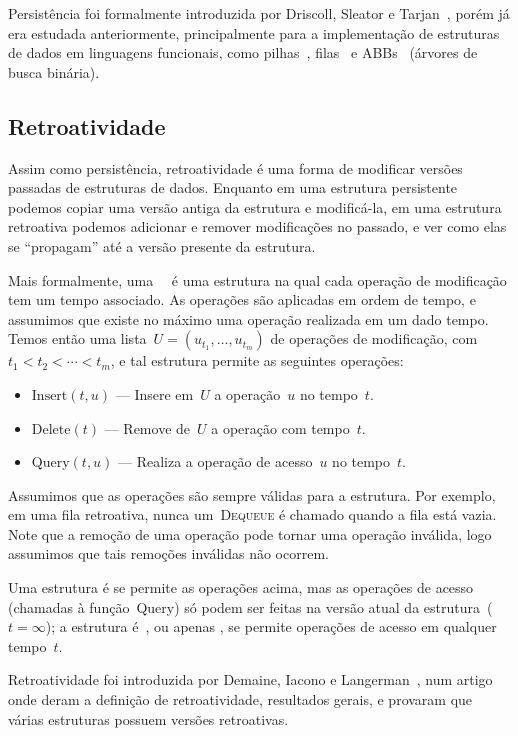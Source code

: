 \documentclass[quali.tex]{subfile}
\begin{document}
Persistência foi formalmente introduzida por Driscoll, Sleator e Tarjan~\cite{DriscollSST1989}, porém já era estudada anteriormente, principalmente para a implementação de estruturas de dados em linguagens funcionais, como pilhas~\cite{Myers83}, filas~\cite{HoodMelville} e ABBs~\cite{Myers82} (árvores de busca binária).

\subsection{Retroatividade}

Assim como persistência, retroatividade é uma forma de modificar versões passadas de estruturas de dados. Enquanto em uma estrutura persistente podemos copiar uma versão antiga da estrutura e modificá-la, em uma estrutura retroativa podemos adicionar e remover modificações no passado, e ver como elas se ``propagam'' até a versão presente da estrutura.

Mais formalmente, uma~~\cite{DemaineIL2007} é uma estrutura na qual cada operação de modificação tem um tempo associado. As operações são aplicadas em ordem de tempo, e assumimos que existe no máximo uma operação realizada em um dado tempo. Temos então uma lista~${U = (u_{t_1}, \ldots, u_{t_m})}$ de operações de modificação, com~${t_1 < t_2 < \cdots < t_m}$, e tal estrutura permite as seguintes operações:

\begin{itemize}
	\item $\text{Insert}(t, u)$ --- Insere em~$U$ a operação~$u$ no tempo~$t$.
	\item $\text{Delete}(t)$ --- Remove de~$U$ a operação com tempo~$t$.
	\item $\text{Query}(t, u)$ --- Realiza a operação de acesso~$u$ no tempo~$t$.
\end{itemize}

Assumimos que as operações são sempre válidas para a estrutura. Por exemplo, em uma fila retroativa, nunca um~\textsc{Dequeue} é chamado quando a fila está vazia. Note que a remoção de uma operação pode tornar uma operação inválida, logo assumimos que tais remoções inválidas não ocorrem.

Uma estrutura é  se permite as operações acima, mas as operações de acesso (chamadas à função~Query) só podem ser feitas na versão atual da estrutura~(${t = \infty}$); a estrutura é~, ou apenas , se permite operações de acesso em qualquer tempo~$t$.

Retroatividade foi introduzida por Demaine, Iacono e Langerman~\cite{DemaineIL2007}, num artigo onde deram a definição de retroatividade, resultados gerais, e provaram que várias estruturas possuem versões retroativas.
\end{document}
